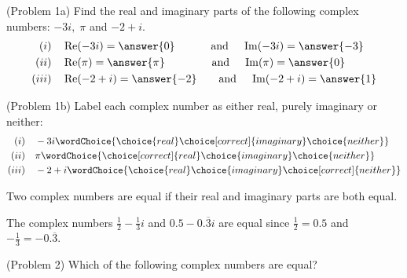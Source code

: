 \documentclass[handout]{ximera}
\begin{document}
\begin{problem}(Problem 1a)
Find the real and imaginary parts of the following complex numbers: $-3i,\; \pi$ and $-2+i$.
\begin{align*}
(i) \quad&\Rep(-3i) = \answer{0} \qquad \quad \; \mbox{and} \quad \; \Imp(-3i) = \answer{-3}\\
(ii) \quad&\Rep(\pi) = \answer{\pi} \qquad \qquad \; \mbox{and} \quad \;\Imp(\pi) = \answer{0}\\
(iii) \quad&\Rep(-2+i) = \answer{-2} \qquad \mbox{and} \quad \; \Imp(-2+i) = \answer{1}\\
\end{align*}

\end{problem}

\begin{problem}(Problem 1b)
Label each complex number as either real, purely imaginary or neither:
\begin{align*}
(i) \quad& -3i \wordChoice{\choice{real}\choice[correct]{imaginary}
                           \choice{neither}}\\
(ii) \quad& \pi  \wordChoice{\choice[correct]{real}\choice{imaginary}
                           \choice{neither}}\\
(iii) \quad& -2+i  \wordChoice{\choice{real}\choice{imaginary}
								\choice[correct]{neither}}
\end{align*}
\end{problem}

Two complex numbers are equal if their real and imaginary parts are both equal. 



\begin{example}[Example 2]
The complex numbers $\frac12 - \frac13 i$ and $0.5 - 0.{\overline 3}i$ are equal since
$\frac12 = 0.5$ and $-\frac13 = -0.{\overline 3}$.
\end{example}

\begin{problem}(Problem 2)
Which of the following complex numbers are equal?

\begin{selectAll}
\end{selectAll}

\end{problem}
\end{document}
